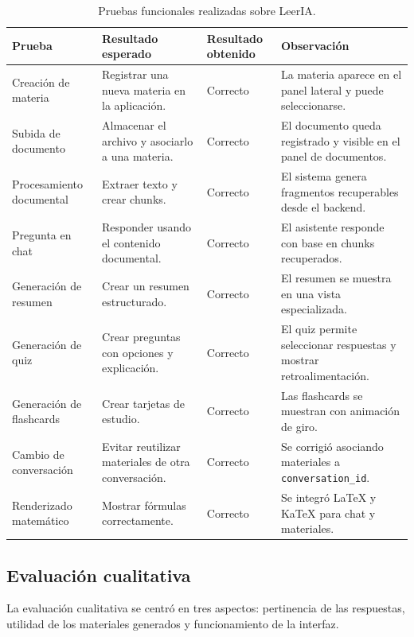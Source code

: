 \documentclass[12pt, letterpaper]{article}
\begin{document}
	\begin{table}[H]
		\centering
		\renewcommand{\arraystretch}{1.3}
		\begin{tabularx}{\textwidth}{p{3.5cm} p{4cm} p{3cm} X}
			\toprule
			\textbf{Prueba} & \textbf{Resultado esperado} & \textbf{Resultado obtenido} & \textbf{Observación} \\
			\midrule
			Creación de materia & Registrar una nueva materia en la aplicación. & Correcto & La materia aparece en el panel lateral y puede seleccionarse. \\
			\midrule
			Subida de documento & Almacenar el archivo y asociarlo a una materia. & Correcto & El documento queda registrado y visible en el panel de documentos. \\
			\midrule
			Procesamiento documental & Extraer texto y crear chunks. & Correcto & El sistema genera fragmentos recuperables desde el backend. \\
			\midrule
			Pregunta en chat & Responder usando el contenido documental. & Correcto & El asistente responde con base en chunks recuperados. \\
			\midrule
			Generación de resumen & Crear un resumen estructurado. & Correcto & El resumen se muestra en una vista especializada. \\
			\midrule
			Generación de quiz & Crear preguntas con opciones y explicación. & Correcto & El quiz permite seleccionar respuestas y mostrar retroalimentación. \\
			\midrule
			Generación de flashcards & Crear tarjetas de estudio. & Correcto & Las flashcards se muestran con animación de giro. \\
			\midrule
			Cambio de conversación & Evitar reutilizar materiales de otra conversación. & Correcto & Se corrigió asociando materiales a \texttt{conversation\_id}. \\
			\midrule
			Renderizado matemático & Mostrar fórmulas correctamente. & Correcto & Se integró LaTeX y KaTeX para chat y materiales. \\
			\bottomrule
		\end{tabularx}
		\caption{Pruebas funcionales realizadas sobre LeerIA.}
		\label{tab:pruebas_funcionales}
	\end{table}
	
	\subsection{Evaluación cualitativa}
	
	La evaluación cualitativa se centró en tres aspectos: pertinencia de las respuestas, utilidad de los materiales generados y funcionamiento de la interfaz.
	
\end{document}
